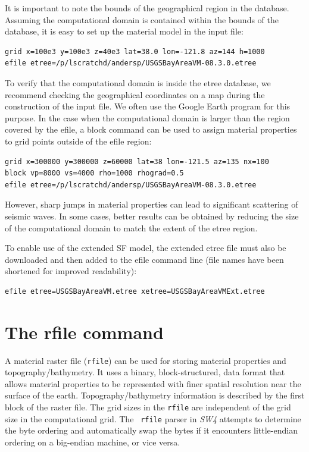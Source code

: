 \documentclass[11pt]{report}
\begin{document}
It is important to note the bounds of the geographical region in the database. Assuming the
computational domain is contained within the bounds of the database, it is easy to set up the
material model in the input file:
\begin{verbatim}
grid x=100e3 y=100e3 z=40e3 lat=38.0 lon=-121.8 az=144 h=1000
efile etree=/p/lscratchd/andersp/USGSBayAreaVM-08.3.0.etree 
\end{verbatim}
To verify that the computational domain is inside the etree database, we recommend checking the
geographical coordinates on a map during the construction of the input file. We often use the Google Earth
program for this purpose.
%
In the case when the computational domain is larger than the region covered by the efile, a block
command can be used to assign material properties to grid points outside of the efile region:
\begin{verbatim}
grid x=300000 y=300000 z=60000 lat=38 lon=-121.5 az=135 nx=100
block vp=8000 vs=4000 rho=1000 rhograd=0.5
efile etree=/p/lscratchd/andersp/USGSBayAreaVM-08.3.0.etree 
\end{verbatim}
However, sharp jumps in material properties can lead to significant scattering of seismic waves. In
some cases, better results can be obtained by reducing the size of the computational domain to match
the extent of the etree region.

To enable use of the extended SF model, the extended etree file must also be downloaded and
then added to the efile command line (file names have been shortened for improved readability):
\begin{verbatim}
efile etree=USGSBayAreaVM.etree xetree=USGSBayAreaVMExt.etree
\end{verbatim}

\section{The rfile command} \label{sec:rfile-mat}

A material raster file ({\tt rfile}) can be used for storing material properties and
topography/bathymetry. It uses a binary, block-structured, data format that allows material
properties to be represented with finer spatial resolution near the surface of the
earth. Topography/bathymetry information is described by the first block of the raster file. The
grid sizes in the {\tt rfile} are independent of the grid size in the computational grid. The {\tt
  rfile} parser in \emph{SW4} attempts to determine the byte ordering and automatically swap the
bytes if it encounters little-endian ordering on a big-endian machine, or vice versa.
\end{document}
